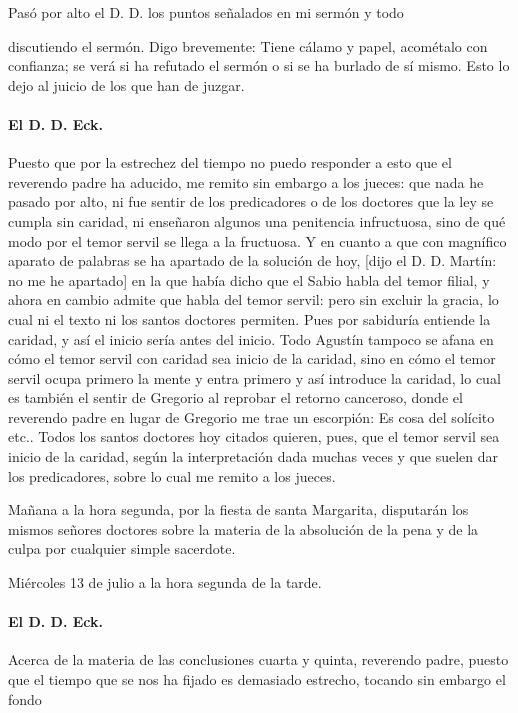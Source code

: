 Pasó por alto el D. D. los puntos señalados en mi sermón y todo

discutiendo el sermón. Digo brevemente: Tiene cálamo y papel, acométalo con confianza; se verá si ha refutado el sermón o si se ha burlado de sí mismo. Esto lo dejo al juicio de los que han de juzgar.

\paragraph*{El D. D. Eck.}

Puesto que por la estrechez del tiempo no puedo responder a esto que el reverendo padre ha aducido, me remito sin embargo a los jueces: que nada he pasado por alto, ni fue sentir de los predicadores o de los doctores que la ley se cumpla sin caridad, ni enseñaron algunos una penitencia infructuosa, sino de qué modo por el temor servil se llega a la fructuosa. Y en cuanto a que con magnífico aparato de palabras se ha apartado de la solución de hoy, [dijo el D. D. Martín: no me he apartado] en la que había dicho que el Sabio habla del temor filial, y ahora en cambio admite que habla del temor servil: pero sin excluir la gracia, lo cual ni el texto ni los santos doctores permiten. Pues por sabiduría entiende la caridad, y así el inicio sería antes del inicio. Todo Agustín tampoco se afana en cómo el temor servil con caridad sea inicio de la caridad, sino en cómo el temor servil ocupa primero la mente y entra primero y así introduce la caridad, lo cual es también el sentir de Gregorio al reprobar el retorno canceroso, donde el reverendo padre en lugar de Gregorio me trae un escorpión: Es cosa del solícito etc.. Todos los santos doctores hoy citados quieren, pues, que el temor servil sea inicio de la caridad, según la interpretación dada muchas veces y que suelen dar los predicadores, sobre lo cual me remito a los jueces.

Mañana a la hora segunda, por la fiesta de santa Margarita, disputarán los mismos señores doctores sobre la materia de la absolución de la pena y de la culpa por cualquier simple sacerdote.

\marginpar{\small[378]} Miércoles 13 de julio a la hora segunda de la tarde.

\paragraph*{El D. D. Eck.}

Acerca de la materia de las conclusiones cuarta y quinta, reverendo padre, puesto que el tiempo que se nos ha fijado es demasiado estrecho, tocando sin embargo el fondo

